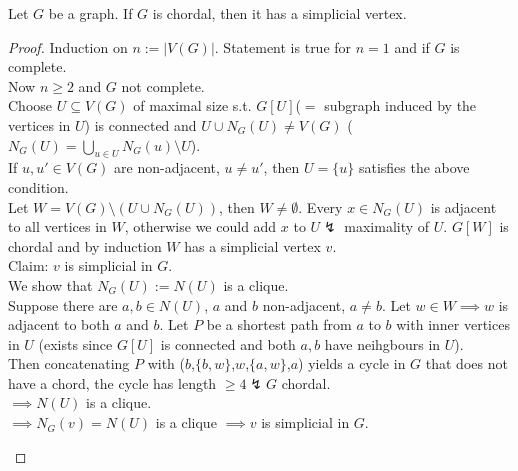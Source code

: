 \begin{lemma}\label{5.23}
    Let $G$ be a  graph. If $G$ is chordal, then it has a simplicial vertex.
\end{lemma}
\begin{proof}
    Induction on $n:=|V(G)|$. Statement is true for $n=1$ and if $G$ is complete.\\
    Now $n\geq 2$ and $G$ not complete.\\
    Choose $U\subseteq V(G)$ of maximal size s.t. $G[U]$($=$ subgraph induced by the vertices in $U$) is connected and $U\cup N_G(U)\neq V(G)$ ($N_G(U)=\bigcup_{u\in U}N_G(u)\setminus U$).\\
    If $u,u'\in V(G)$ are non-adjacent, $u\neq u'$, then $U=\{u\}$ satisfies the above condition.\\
    Let $W=V(G)\setminus (U\cup N_G(U))$, then $W\neq \emptyset$. Every $x\in N_G(U)$ is adjacent to all vertices in $W$, otherwise we could add $x$ to $U\lightning$ maximality of $U$. $G[W]$ is chordal and by induction $W$ has a simplicial vertex $v$.\\
    Claim: $v$ is simplicial in $G$.\\
    We show that $N_G(U):=N(U)$ is a clique.\\
    Suppose there are $a,b\in N(U)$, $a$ and $b$ non-adjacent, $a\neq b$. Let $w\in W\implies w$ is adjacent to both $a$ and $b$. Let $P$ be a shortest path from $a$ to $b$ with inner vertices in $U$ (exists since $G[U]$ is connected and both $a,b$ have neihgbours in $U$).\\
    Then concatenating $P$ with ($b$,$\{b,w\}$,$w$,$\{a,w\}$,$a$) yields a cycle in $G$ that does not have a chord, the cycle has length $\geq 4\lightning G$ chordal.\\
    $\implies N(U)$ is a clique.\\
    $\implies N_G(v)=N(U)$ is a clique $\implies v$ is simplicial in $G$.\\
    \begin{center}
        \end{center}
\end{proof}
